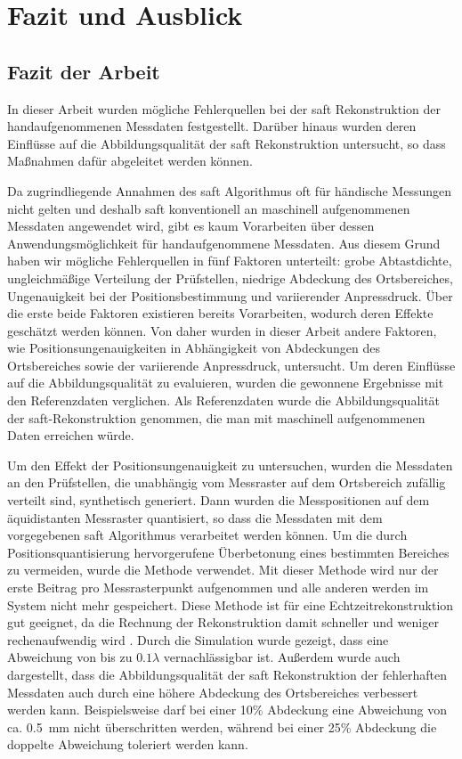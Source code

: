\chapter{Fazit und Ausblick} \label{chap:conclusion}

\section{Fazit der Arbeit}
In dieser Arbeit wurden mögliche Fehlerquellen bei der \acrshort{saft} Rekonstruktion der handaufgenommenen Messdaten festgestellt. Darüber hinaus wurden deren Einflüsse auf die Abbildungsqualität der \acrshort{saft} Rekonstruktion untersucht, so dass Maßnahmen dafür abgeleitet werden können. \par
Da zugrindliegende Annahmen des \acrshort{saft} Algorithmus oft für händische Messungen nicht gelten und deshalb \acrshort{saft} konventionell an maschinell aufgenommenen Messdaten angewendet wird, gibt es kaum Vorarbeiten über dessen Anwendungsmöglichkeit für handaufgenommene Messdaten. Aus diesem Grund haben wir mögliche Fehlerquellen in fünf Faktoren unterteilt: grobe Abtastdichte, ungleichmäßige Verteilung der Prüfstellen, niedrige Abdeckung des Ortsbereiches, Ungenauigkeit bei der Positionsbestimmung und variierender Anpressdruck. Über die erste beide Faktoren existieren bereits Vorarbeiten, wodurch deren Effekte geschätzt werden können. Von daher wurden in dieser Arbeit andere Faktoren, wie Positionsungenauigkeiten in Abhängigkeit von Abdeckungen des Ortsbereiches sowie der variierende Anpressdruck, untersucht. Um deren Einflüsse auf die Abbildungsqualität zu evaluieren, wurden die gewonnene Ergebnisse mit den Referenzdaten verglichen. Als Referenzdaten wurde die Abbildungsqualität der \acrshort{saft}-Rekonstruktion genommen, die man mit maschinell aufgenommenen Daten erreichen würde. \par
Um den Effekt der Positionsungenauigkeit zu untersuchen, wurden die Messdaten an den Prüfstellen, die unabhängig vom Messraster auf dem Ortsbereich zufällig verteilt sind, synthetisch generiert. Dann wurden die Messpositionen auf dem äquidistanten Messraster quantisiert, so dass die Messdaten mit dem vorgegebenen \acrshort{saft} Algorithmus verarbeitet werden können. Um die durch Positionsquantisierung hervorgerufene Überbetonung eines bestimmten Bereiches zu vermeiden, wurde die  Methode verwendet. Mit dieser Methode wird nur der erste Beitrag pro Messrasterpunkt aufgenommen und alle anderen werden im System nicht mehr gespeichert. Diese Methode ist für eine Echtzeitrekonstruktion gut geeignet, da die Rechnung der Rekonstruktion damit schneller und weniger rechenaufwendig wird \cite{Krieg18SAFTwithSmartInspect}. Durch die Simulation wurde gezeigt, dass eine Abweichung von bis zu $0.1 \lambda$ vernachlässigbar ist. Außerdem wurde auch dargestellt, dass die Abbildungsqualität der \acrshort{saft} Rekonstruktion der fehlerhaften Messdaten auch durch eine höhere Abdeckung des Ortsbereiches verbessert werden kann. Beispielsweise darf bei einer 10\% Abdeckung eine Abweichung von ca. \SI{0.5}{\milli\metre} nicht überschritten werden, während bei einer 25\% Abdeckung die doppelte Abweichung toleriert werden kann. \par
